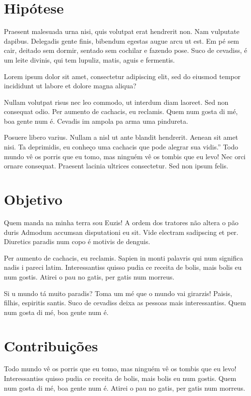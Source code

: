\section{Hipótese}
Praesent malesuada urna nisi, quis volutpat erat hendrerit non. Nam vulputate dapibus. Delegadis gente finis, bibendum egestas augue arcu ut est. Em pé sem cair, deitado sem dormir, sentado sem cochilar e fazendo pose. Suco de cevadiss, é um leite divinis, qui tem lupuliz, matis, aguis e fermentis.
\begin{hipo}
Lorem ipsum dolor sit amet, consectetur adipiscing elit, sed do eiusmod tempor incididunt ut labore et dolore magna aliqua?
\end{hipo}



Nullam volutpat risus nec leo commodo, ut interdum diam laoreet. Sed non consequat odio. Per aumento de cachacis, eu reclamis. Quem num gosta di mé, boa gente num é. Cevadis im ampola pa arma uma pindureta.

Posuere libero varius. Nullam a nisl ut ante blandit hendrerit. Aenean sit amet nisi. Ta deprimidis, eu conheço uma cachacis que pode alegrar sua vidis.” Todo mundo vê os porris que eu tomo, mas ninguém vê os tombis que eu levo! Nec orci ornare consequat. Praesent lacinia ultrices consectetur. Sed non ipsum felis. 

\section{Objetivo}
Quem manda na minha terra sou Euzis! A ordem dos tratores não altera o pão duris Admodum accumsan disputationi eu sit. Vide electram sadipscing et per. Diuretics paradis num copo é motivis de denguis.

Per aumento de cachacis, eu reclamis. Sapien in monti palavris qui num significa nadis i pareci latim. Interessantiss quisso pudia ce receita de bolis, mais bolis eu num gostis. Atirei o pau no gatis, per gatis num morreus.

Si u mundo tá muito paradis? Toma um mé que o mundo vai girarzis! Paisis, filhis, espiritis santis. Suco de cevadiss deixa as pessoas mais interessantiss. Quem num gosta di mé, boa gente num é. 

\section{Contribuições}
Todo mundo vê os porris que eu tomo, mas ninguém vê os tombis que eu levo! Interessantiss quisso pudia ce receita de bolis, mais bolis eu num gostis. Quem num gosta di mé, boa gente num é. Atirei o pau no gatis, per gatis num morreus.


